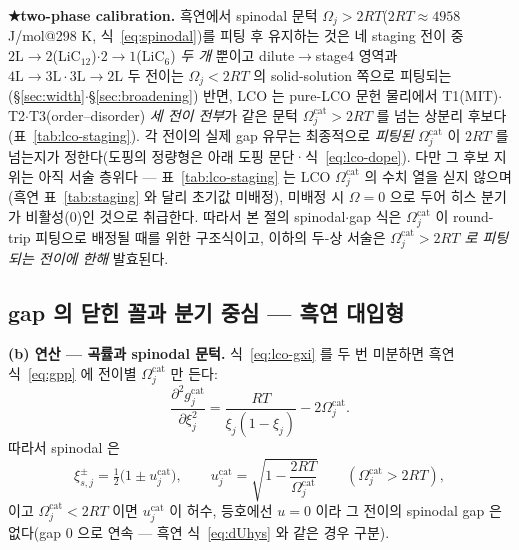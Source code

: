\textbf{★two-phase calibration.}
흑연에서 spinodal 문턱 $\Omega_j>2RT$($2RT\approx4958$ J/mol@298 K, 식~\eqref{eq:spinodal})를 피팅 후
유지하는 것은 네 staging 전이 중 $2\mathrm L\!\to\!2$(LiC$_{12}$)$\cdot$$2\!\to\!1$(LiC$_6$) \emph{두 개}
뿐이고 dilute$\to$stage4 영역과 $4\mathrm L\!\to\!3\mathrm L\cdot3\mathrm L\!\to\!2\mathrm L$ 두 전이는 $\Omega_j<2RT$ 의
solid-solution 쪽으로 피팅되는(\S\ref{sec:width}$\cdot$\S\ref{sec:broadening}) 반면, LCO 는 pure-LCO
문헌 물리에서 T1(MIT)$\cdot$T2$\cdot$T3(order--disorder) \emph{세 전이 전부}가 같은 문턱
$\Omega_j^\mathrm{cat}>2RT$ 를 넘는 상분리 후보다(표~\ref{tab:lco-staging}). 각 전이의 실제 gap 유무는 최종적으로
\emph{피팅된} $\Omega_j^\mathrm{cat}$ 이 $2RT$ 를 넘는지가 정한다(도핑의 정량형은 아래 도핑 문단·식~\eqref{eq:lco-dope}). 다만 그 후보 지위는 아직 서술
층위다 --- 표~\ref{tab:lco-staging} 는 LCO $\Omega_j^\mathrm{cat}$ 의 수치 열을 싣지 않으며(흑연
표~\ref{tab:staging} 와 달리 초기값 미배정), 미배정 시 $\Omega=0$ 으로 두어 히스 분기가 비활성(0)인
것으로 취급한다. 따라서 본 절의 spinodal$\cdot$gap 식은 $\Omega_j^\mathrm{cat}$
이 round-trip 피팅으로 배정될 때를 위한 구조식이고, 이하의 두-상 서술은 \emph{$\Omega_j^\mathrm{cat}>2RT$
로 피팅되는 전이에 한해} 발효된다.

\subsection{gap 의 닫힌 꼴과 분기 중심 --- 흑연 대입형}\label{sec:lco-hys-gap}
\textbf{(b) 연산 --- 곡률과 spinodal 문턱.}
식~\eqref{eq:lco-gxi} 를 두 번 미분하면 흑연 식~\eqref{eq:gpp} 에 전이별 $\Omega_j^\mathrm{cat}$ 만 든다:
\begin{equation}
\frac{\partial^2 g_j^\mathrm{cat}}{\partial\xi_j^2}=\frac{RT}{\xi_j(1-\xi_j)}-2\Omega_j^\mathrm{cat}.
\label{eq:lco-gpp}
\end{equation}
따라서 spinodal 은
\begin{equation}
\xi_{s,j}^{\pm}=\tfrac12\big(1\pm u_j^\mathrm{cat}\big),\qquad
u_j^\mathrm{cat}=\sqrt{1-\frac{2RT}{\Omega_j^\mathrm{cat}}}\qquad(\Omega_j^\mathrm{cat}>2RT),
\label{eq:lco-spinodal}
\end{equation}
이고 $\Omega_j^\mathrm{cat}<2RT$ 이면 $u_j^\mathrm{cat}$ 이 허수, 등호에선 $u=0$ 이라 그 전이의 spinodal gap 은 없다(gap $0$ 으로 연속 ---
흑연 식~\eqref{eq:dUhys} 와 같은 경우 구분).

